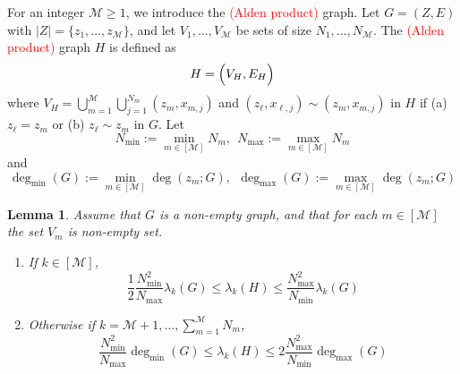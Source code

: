 \documentclass{article}
\newcommand{\abs}[1]{\left \lvert #1 \right \rvert}
\newcommand{\1}{\mathbf{1}}
\newcommand{\mc}[1]{\mathcal{#1}}
\theoremstyle{alden}
\theoremstyle{aldenthm}
\newtheorem{lemma}{Lemma}
\theoremstyle{definition}
\theoremstyle{remark}
\begin{document}
For an integer $\mc{M} \geq 1$, we introduce the \textcolor{red}{(Alden product)} graph. Let $G = (Z,E)$ with $\abs{Z} = \{z_1,\ldots,z_{\mc{M}}\}$, and let $V_1,\ldots,V_{\mc{M}}$ be sets of size $N_1,\ldots,N_{\mc{M}}$. The \textcolor{red}{(Alden product)} graph $H$ is defined as
\begin{equation*}
H = \Bigl(V_H, E_H\Bigr)
\end{equation*}
where $V_H = \bigcup_{m = 1}^{\mc{M}} \bigcup_{j = 1}^{N_m} (z_m,x_{m,j})$ and  $(z_{\ell},x_{\ell,j}) \sim (z_m,x_{m,j})$ in $H$ if (a) $z_{\ell} = z_m$ or (b) $z_{\ell} \sim z_m$ in $G$. Let
\begin{equation*}
N_{\min} := \min_{m \in [\mc{M}]} N_m,~~ N_{\max} := \max_{m \in [\mc{M}]} N_m
\end{equation*} 
and
\begin{equation*}
\deg_{\min}(G) := \min_{m \in [\mc{M}]} \deg(z_m;G),~~ \deg_{\max}(G) := \max_{m \in [\mc{M}]} \deg(z_m;G)
\end{equation*}
\begin{lemma}
	\label{lem:alden_product_graph}
	Assume that $G$ is a non-empty graph, and that for each $m \in [\mc{M}]$ the set $V_m$ is non-empty set. 
	\begin{enumerate}
		\item If $k \in [\mc{M}]$, 
		\begin{equation*}
		\frac{1}{2}\frac{N_{\min}^2}{N_{\max}} \lambda_k(G) \leq \lambda_k(H) \leq \frac{N_{\max}^2}{N_{\min}} \lambda_k(G)
		\end{equation*}
		\item Otherwise if $k = \mc{M} + 1,\ldots,\sum_{m = 1}^{\mc{M}}N_m$,
		\begin{equation*}
		\frac{N_{\min}^2}{N_{\max}} \deg_{\min}(G) \leq \lambda_k(H) \leq 2 \frac{N_{\max}^2}{N_{\min}} \deg_{\max}(G)
		\end{equation*}
	\end{enumerate}
\end{lemma}
\end{document}
